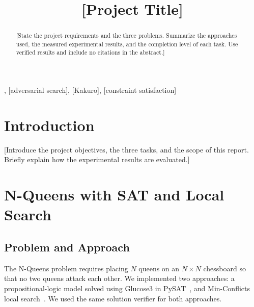 \documentclass[conference]{IEEEtran}
\begin{document}
\title{[Project Title]}

\author{
    \and
    \and
    \and
}
\maketitle

\begin{abstract}
    [State the project requirements and the three problems. Summarize the
        approaches used, the measured experimental results, and the completion level
        of each task. Use verified results and include no citations in the abstract.]
\end{abstract}

\begin{IEEEkeywords}
    [N-Queens], [adversarial search], [Kakuro], [constraint satisfaction]
\end{IEEEkeywords}

\section{Introduction}
 [Introduce the project objectives, the three tasks, and the scope of this
  report. Briefly explain how the experimental results are evaluated.]

\section{N-Queens with SAT and Local Search}
\subsection{Problem and Approach}
The N-Queens problem requires placing \(N\) queens on an \(N\times N\) chessboard so that no two queens attack each other. We implemented two approaches: a propositional-logic model solved using Glucose3 in PySAT~\cite{pysat}, and Min-Conflicts local search~\cite{minton}. We used the same solution verifier for both approaches.
\end{document}
